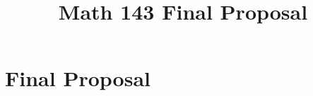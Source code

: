 \documentclass[11pt,letterpaper,cm]{hmcpset}
\title{Math 143 Final Proposal}
\begin{document}
\section{Final Proposal}
\end{document}
